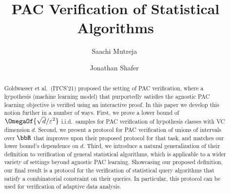 \documentclass{toc}
\begin{document}
\begin{frontmatter}%

%
%
%

%
%

%
%

\title{PAC Verification of Statistical Algorithms}
%
%
%

%
%
%
%
%
%
%
%
%
%
%
%


%
%
%
%

%

%

%
%
%
%
\author[mutreja]{Saachi Mutreja\,\,}
\author[shafer]{Jonathan Shafer\,\,}


%
%
%
%

%
%
%
%
%
%
%
%
\begin{abstract}
  Goldwasser et al.\ (ITCS'21) proposed the setting of PAC verification, where a hypothesis (machine learning model) that purportedly satisfies the agnostic PAC learning objective is verified using an interactive proof. In this paper we develop this notion further in a number of ways. First, we prove a lower bound of $\OmegaOf{\sqrt{d}/\varepsilon^2}$ i.i.d.\ samples for PAC verification of hypothesis classes with VC dimension $d$. Second, we present a protocol for PAC verification of unions of intervals over $\bbR$ that improves upon their proposed protocol for that task, and matches our lower bound's dependence on $d$. Third, we introduce a natural generalization of their definition to verification of general statistical algorithms, which is applicable to a wider variety of settings beyond agnostic PAC learning. Showcasing our proposed definition, our final result is a protocol for the verification of statistical query algorithms that satisfy a combinatorial constraint on their queries. In particular, this protocol can be used for verification of adaptive data analysis.
\end{abstract}

%

\end{frontmatter}
\end{document}
